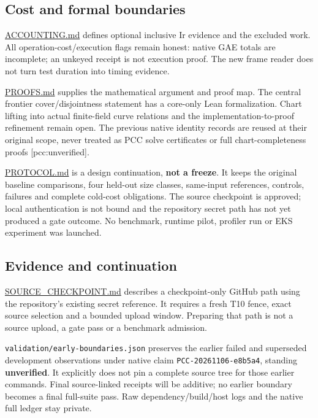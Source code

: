 \documentclass[
  10pt,
]{article}
\begin{document}
\subsection{Cost and formal
boundaries}\label{cost-and-formal-boundaries}

\url{ACCOUNTING.md} defines optional inclusive Ir evidence and the
excluded work. All operation-cost/execution flags remain honest: native
GAE totals are incomplete; an unkeyed receipt is not execution proof.
The new frame reader does not turn test duration into timing evidence.

\url{PROOFS.md} supplies the mathematical argument and proof map. The
central frontier cover/disjointness statement has a core-only Lean
formalization. Chart lifting into actual finite-field curve relations
and the implementation-to-proof refinement remain open. The previous
native identity records are reused at their original scope, never
treated as PCC solve certificates or full chart-completeness proofs
{[}pcc:unverified{]}.

\url{PROTOCOL.md} is a design continuation, \textbf{not a freeze}. It
keeps the original baseline comparisons, four held-out size classes,
same-input references, controls, failures and complete cold-cost
obligations. The source checkpoint is approved; local authentication is
not bound and the repository secret path has not yet produced a gate
outcome. No benchmark, runtime pilot, profiler run or EKS experiment was
launched.

\subsection{Evidence and continuation}\label{evidence-and-continuation}

\url{SOURCE_CHECKPOINT.md} describes a checkpoint-only GitHub path using
the repository's existing secret reference. It requires a fresh T10
fence, exact source selection and a bounded upload window. Preparing
that path is not a source upload, a gate pass or a benchmark admission.

\texttt{validation/early-boundaries.json} preserves the earlier failed
and superseded development observations under native claim
\texttt{PCC-20261106-e8b5a4}, standing \textbf{unverified}. It
explicitly does not pin a complete source tree for those earlier
commands. Final source-linked receipts will be additive; no earlier
boundary becomes a final full-suite pass. Raw dependency/build/host logs
and the native full ledger stay private.
\end{document}
